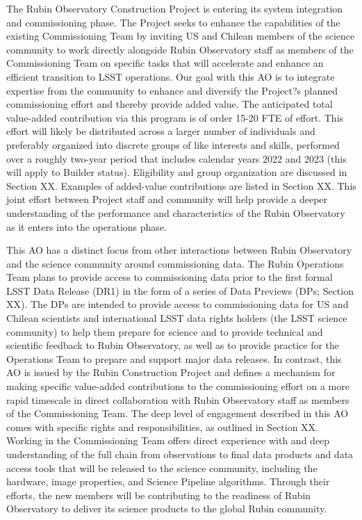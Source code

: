 \documentclass[SE,authoryear,toc]{lsstdoc}
\begin{document}
The Rubin Observatory Construction Project is entering its system integration and commissioning phase. The Project seeks to enhance the capabilities of the existing Commissioning Team by inviting US and Chilean members of the science community to work directly alongside Rubin Observatory staff as members of the Commissioning Team on specific tasks that will accelerate and enhance an efficient transition to LSST operations. Our goal with this AO is to integrate expertise from the community to enhance and diversify the Project?s planned commissioning effort and thereby provide added value. The anticipated total value-added contribution via this program is of order 15-20 FTE of effort. This effort will likely be distributed across a larger number of individuals and preferably organized into discrete groups of like interests and skills, performed over a roughly two-year period that includes calendar years 2022 and 2023 (this will apply to Builder status). Eligibility and group organization are discussed in Section XX. Examples of added-value contributions are listed in Section XX. This joint effort between Project staff and community will help provide a deeper understanding of the performance and characteristics of the Rubin Observatory as it enters into the operations phase.

This AO has a distinct focus from other interactions between Rubin Observatory and the science community around commissioning data. The Rubin Operations Team plans to provide access to commissioning data prior to the first formal LSST Data Release (DR1) in the form of a series of Data Previews (DPs; Section XX). The DPs are intended to provide access to commissioning data for US and Chilean scientists and international LSST data rights holders (the LSST science community) to help them prepare for science and to provide technical and scientific feedback to Rubin Observatory, as well as to provide practice for the Operations Team to prepare and support major data releases. In contrast, this AO is issued by the Rubin Construction Project and defines a mechanism for making specific value-added contributions to the commissioning effort on a more rapid timescale in direct collaboration with Rubin Observatory staff as members of the Commissioning Team. The deep level of engagement described in this AO comes with specific rights and responsibilities, as outlined in Section XX. Working in the Commissioning Team offers direct experience with and deep understanding of the full chain from observations to final data products and data access tools that will be released to the science community, including the hardware, image properties, and Science Pipeline algorithms. Through their efforts, the new members will be contributing to the readiness of Rubin Observatory to deliver its science products to the global Rubin community. 
\end{document}
